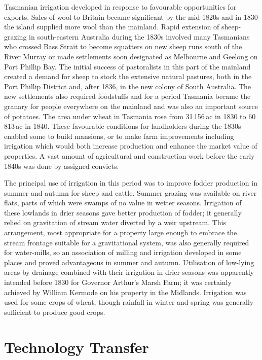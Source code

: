 Tasmanian irrigation developed in response to favourable opportunities
for exports.  Sales of wool to Britain became significant by the mid
1820s and in 1830 the island supplied more wool than the mainland.
Rapid extension of sheep-grazing in south-eastern Australia during the
1830s involved many Tasmanians who crossed Bass Strait to become
squatters on new sheep runs south of the River Murray or made
settlements soon designated as Melbourne and Geelong on Port Phillip
Bay.  The initial success of pastoralists in this part of the mainland
created a demand for sheep to stock the extensive natural pastures,
both in the Port Phillip District and, after 1836, in the new colony
of South Australia.  The new settlements also required foodstuffs and
for a period Tasmania became the granary for people everywhere on the
mainland and was also an important source of potatoes.  The area under
wheat in Tasmania rose from 31\,156\,ac in 1830 to 60\,813\,ac in
1840.  These favourable conditions for landholders during the 1830s
enabled some to build mansions, or to make farm improvements including
irrigation which would both increase production and enhance the market
value of properties.  A vast amount of agricultural and construction
work before the early 1840s was done by assigned
convicts.

The principal use of irrigation in this period was to improve fodder
production in summer and autumn for sheep and cattle. Summer grazing
was available on river flats, parts of which were swamps of no value
in wetter seasons.  Irrigation of these lowlands in drier seasons gave
better production of fodder; it generally relied on gravitation of
stream water diverted by a weir upstream.  This arrangement, most
appropriate for a property large enough to embrace the stream frontage
suitable for a gravitational system, was also generally required for
water-mills, so an association of milling and irrigation developed in
some places and proved advantageous in summer and autumn.  Utilisation
of low-lying areas by drainage combined with their irrigation in drier
seasons was apparently intended before 1830 for Governor Arthur's
Marsh Farm; it was certainly achieved by William Kermode on his
property in the Midlands.  Irrigation was used for some crops of
wheat, though rainfall in winter and spring was generally sufficient
to produce good crops.

\section*{Technology Transfer}

